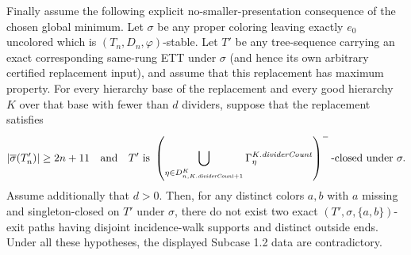 \begin{lemma}
Finally assume the following explicit no-smaller-presentation consequence
of the chosen global minimum.  Let $\sigma$ be any proper coloring leaving
exactly $e_0$ uncolored which is $(T_n,D_n,\varphi)$-stable.  Let $T'$ be
any tree-sequence carrying an exact corresponding same-rung ETT under
$\sigma$ (and hence its own arbitrary certified replacement input), and
assume that this replacement has maximum property.  For every hierarchy
base of the replacement and every good hierarchy $K$ over that base with
fewer than $d$ dividers, suppose that the replacement satisfies
\[
 |\overline\sigma(T'_n)|\geq2n+11
 \quad\hbox{and}\quad
 T'\text{ is }
 \left(\bigcup_{\eta\in D^K_{n,K.\mathit{dividerCount}+1}}
   \Gamma^{K.\mathit{dividerCount}}_\eta\right)^-
 \text{-closed under }\sigma .
\]
Assume additionally that $d>0$.  Then, for any distinct colors $a,b$ with $a$ missing and singleton-closed
on $T'$ under $\sigma$, there do not exist two exact
$(T',\sigma,\{a,b\})$-exit paths having disjoint incidence-walk supports
and distinct outside ends.  Under all these hypotheses, the displayed
Subcase 1.2 data are contradictory.
\end{lemma}
